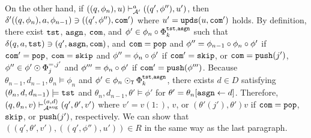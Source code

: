 On the other hand,
if $((q,\phi_n),u)\vdash_{{\cal A}'}^a ((q',\phi''),u')$, then
$\delta'((q,\phi_n),a,\allowbreak
\phi_{n-1})\ni ((q',\phi''),\mathtt{com}')$
where $u'=\mathtt{upds}(u,\mathtt{com}')$ holds.
By definition,
there exist $\mathtt{tst}$, $\mathtt{asgn}$, $\mathtt{com}$, and
$\phi'\in\phi_n\circ\Phi_k^{\mathtt{tst},\mathtt{asgn}}$ such that
$\delta(q,a,\mathtt{tst})\ni(q',\mathtt{asgn},\mathtt{com})$, and
$\mathtt{com}=\mathtt{pop}$ and $\phi''=\phi_{n-1}\circ\phi_n\circ\phi'$
if $\mathtt{com}'=\mathtt{pop}$,
$\mathtt{com}=\mathtt{skip}$ and $\phi''=\phi_n\circ\phi'$ if $\mathtt{com}'=\mathtt{skip}$,
or
$\mathtt{com}=\mathtt{push}(j')$, $\phi''\in\phi'\odot\Phi_j^{=,j'}$
and $\phi'''=\phi_n\circ\phi'$ if $\mathtt{com}'=\mathtt{push}(\phi''')$.
Because $\theta_{n-1},d_{n-1},\theta_n\models\phi_n$ and
$\phi'\in\phi_n\odot_{\mathtt{T}}\Phi_k^{\mathtt{tst},\mathtt{asgn}}$,
there exists $d\in D$ satisfying
$(\theta_n,d,d_{n-1})\models\mathtt{tst}$ and
$\theta_n,d_{n-1},\theta'\models\phi'$
for $\theta'=\theta_n[\mathtt{asgn}\gets d]$.
Therefore,
$(q,\theta_n,v)\vdash_{{\cal A}^{\mathrm{aug}}}^{(a,d)} (q',\theta',v')$
where
$v'=v(1{:})$, $v$, or
$(\theta'(j'),\theta')v$
if $\mathtt{com}=\mathtt{pop}$, $\mathtt{skip}$, or $\mathtt{push}(j')$, respectively.
We can show that $((q',\theta',v'),((q',\phi''),u'))\in R$
in the same way as the last paragraph.

